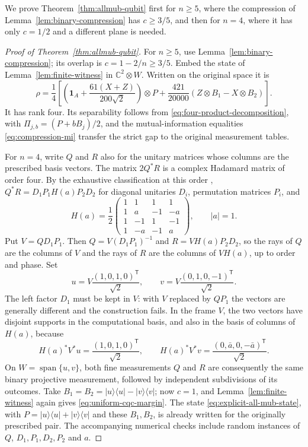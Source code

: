 We prove Theorem~\ref{thm:allmub-qubit} first for $n\geq5$, where the
compression of Lemma~\ref{lem:binary-compression} has $c\geq3/5$, and
then for $n=4$, where it has only $c=1/2$ and a different plane is
needed.

\begin{proof}[Proof of Theorem~\ref{thm:allmub-qubit}]
 For $n\geq5$, use Lemma~\ref{lem:binary-compression}; its overlap
 is $c=1-2/n\geq3/5$.  Embed the state of
 Lemma~\ref{lem:finite-witness} in $\mathbb C^2\otimes W$.
 Written on the original space it is
 \begin{equation}
  \rho=\frac14\left[
   \left(\mathbf1_A+\frac{61(X+Z)}{200\sqrt2}\right)\otimes P
   +\frac{421}{20000}(Z\otimes B_1-X\otimes B_2)
  \right].
  \label{eq:explicit-all-mub-state}
 \end{equation}
 It has rank four.  Its separability follows from
 \eqref{eq:four-product-decomposition}, with
 $\Pi_{j,b}=(P+bB_j)/2$, and the mutual-information equalities
 \eqref{eq:compression-mi} transfer the strict gap to the original
 measurement tables.

 For $n=4$, write $Q$ and $R$ also for the unitary matrices whose
 columns are the prescribed basis vectors.  The matrix $2Q^*R$ is a
 complex Hadamard matrix of order four.  By the exhaustive
 classification at this order \cite[Section~5.4, equations~(62)--(65)]{tadej},
 $Q^*R=D_1P_1H(a)P_2D_2$ for diagonal unitaries $D_i$, permutation
 matrices $P_i$, and
 \begin{equation}
 H(a)=\frac12\begin{pmatrix}
  1&1&1&1\\
  1&a&-1&-a\\
  1&-1&1&-1\\
  1&-a&-1&a
 \end{pmatrix},\qquad |a|=1.
 \label{eq:hadamard-four}
 \end{equation}
 Put $V=QD_1P_1$.  Then $Q=V(D_1P_1)^{-1}$ and $R=VH(a)P_2D_2$, so the
 rays of $Q$ are the columns of $V$ and the rays of $R$ are the columns
 of $VH(a)$, up to order and phase.  Set
 \[
  u=V\frac{(1,0,1,0)^{\mathsf T}}{\sqrt2},\qquad
  v=V\frac{(0,1,0,-1)^{\mathsf T}}{\sqrt2}.
 \]
 The left factor $D_1$ must be kept in $V$: with $V$ replaced by
 $QP_1$ the vectors are generally different and the construction
 fails.  In the frame $V$, the two vectors have disjoint supports in the
 computational basis, and also in the basis of columns of $H(a)$,
 because
 \[
  H(a)^*V^*u=\frac{(1,0,1,0)^{\mathsf T}}{\sqrt2},\qquad
  H(a)^*V^*v=\frac{(0,\bar a,0,-\bar a)^{\mathsf T}}{\sqrt2}.
 \]
 On $W=\operatorname{span}\{u,v\}$, both fine measurements $Q$ and $R$
 are consequently the same binary projective measurement, followed by
 independent subdivisions of its outcomes.  Take
 $B_1=B_2=|u\rangle\langle u|-|v\rangle\langle v|$;
 now $c=1$, and Lemma~\ref{lem:finite-witness} again gives
 \eqref{eq:uniform-cqc-margin}.  The state
 \eqref{eq:explicit-all-mub-state}, with $P=|u\rangle\langle u|+|v\rangle\langle v|$
 and these $B_1,B_2$, is already written for the originally prescribed
 pair.  The accompanying numerical checks include random instances of
 $Q$, $D_1,P_1,D_2,P_2$ and $a$.


\end{proof}
